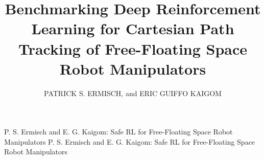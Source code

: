 \documentclass{ieeeaccess}
\begin{document}

\title{Benchmarking Deep Reinforcement Learning for Cartesian Path Tracking of Free-Floating Space Robot Manipulators}
\author{\uppercase{Patrick S. Ermisch}, and 
\uppercase{Eric Guiffo Kaigom} }
\address[1]{Department of Computer Science \& Engineering, Frankfurt University of Applied Sciences, Frankfurt am Main, Germany \\(e-mail: steven.ermisch@stud.fra-uas.de, kaigom@fra-uas.de)}

\markboth
{P. S. Ermisch and E. G. Kaigom: Safe RL for Free-Floating Space Robot Manipulators}
{P. S. Ermisch and E. G. Kaigom: Safe RL for Free-Floating Space Robot Manipulators}

\end{document}
